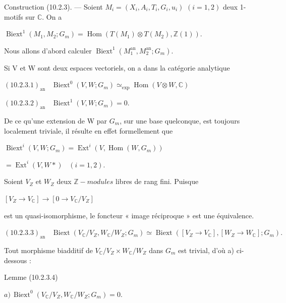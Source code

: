 \documentclass[11pt,twoside]{article}
\newcommand{\DFormula}[1]{%
  \par\smallskip\noindent\hspace*{0pt}\(\displaystyle #1\)\par\smallskip
}
\begin{document}
Construction (10.2.3). — Soient \(M_{i}=(X_{i},A_{i},T_{i},G_{i},u_{i})\) \((i=1,2)\) deux 1-motifs sur \(\mathbb{C}\). On a\par
\par\medskip
\DFormula{\operatorname{Biext}^{1}(M_{1},M_{2};G_{m})=\operatorname{Hom}(T(M_{1})\otimes T(M_{2}),\mathbb{Z}(1)).}
\par\medskip
Nous allons d’abord calculer \(\operatorname{Biext}^{1}(M_{1}^{\mathrm{an}},M_{2}^{\mathrm{an}};G_{m})\).\par
Si V et W sont deux espaces vectoriels, on a dans la catégorie analytique\par
\par\medskip
\DFormula{(10.2.3.1)_{\mathrm{an}}\,\,\,\,\,\operatorname{Biext}^{0}(V,W;G_{m})\simeq _{\operatorname{exp}}\operatorname{Hom}(V\otimes W,\mathbb{C})}
\DFormula{(10.2.3.2)_{\mathrm{an}}\,\,\,\,\,\operatorname{Biext}^{1}(V,W;G_{m})=0.}
\par\medskip
De ce qu’une extension de W par \(G_{m}\), sur une base quelconque, est toujours localement triviale, il résulte en effet formellement que\par
\par\medskip
\DFormula{\operatorname{Biext}^{i}(V,W;G_{m})=\operatorname{Ext}^{i}(V,\operatorname{Hom}(W,G_{m}))}
\DFormula{=\operatorname{Ext}^{i}(V,W\ast )\,\,\,\,\,(i=1,2).}
\par\medskip
Soient \(V_{Z}\) et \(W_{Z}\) deux \(\mathbb{Z}-modules\) libres de rang fini. Puisque\par
\par\medskip
\DFormula{[V_{Z}\to V_{\mathbb{C}}]\to [0\to V_{\mathbb{C}}/V_{Z}]}
\par\medskip
est un quasi-isomorphisme, le foncteur « image réciproque » est une équivalence.\par
\par\medskip
\DFormula{(10.2.3.3)_{\mathrm{an}}\,\,\,\,\,\operatorname{Biext}(V_{\mathbb{C}}/V_{Z},W_{\mathbb{C}}/W_{Z};G_{m})\simeq \operatorname{Biext}([V_{Z}\to V_{\mathbb{C}}],[W_{Z}\to W_{\mathbb{C}}];G_{m}).}
\par\medskip
Tout morphisme biadditif de \(V_{\mathbb{C}}/V_{Z}\times W_{\mathbb{C}}/W_{Z}\) dans \(G_{m}\) est trivial, d’où a) ci-dessous :\par
\par\medskip
Lemme (10.2.3.4)\par
\par\medskip
\DFormula{a)\,\operatorname{Biext}^{0}(V_{\mathbb{C}}/V_{Z},W_{\mathbb{C}}/W_{Z};G_{m})=0.}
\end{document}
